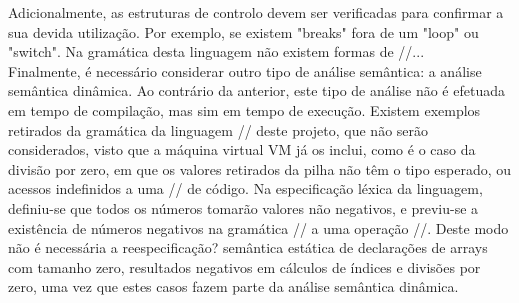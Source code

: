 Adicionalmente, as estruturas de controlo devem ser verificadas para confirmar a sua devida utilização.
Por exemplo, se existem "breaks" fora de um "loop" ou "switch". Na gramática desta linguagem não existem
formas de //...\\

Finalmente, é necessário considerar outro tipo de análise semântica: a análise semântica dinâmica.
Ao contrário da anterior, este tipo de análise não é efetuada em tempo de compilação, mas sim
em tempo de execução. Existem exemplos retirados da gramática da linguagem // deste projeto, que 
não serão considerados, visto que a máquina virtual VM já os inclui, como é o caso da divisão por
zero, em que os valores retirados da pilha não têm o tipo esperado, ou acessos indefinidos a uma
// de código. Na especificação léxica da linguagem, definiu-se que todos os números tomarão valores
não negativos, e previu-se a existência de números negativos na gramática // a uma operação //. 
Deste modo não é necessária a reespecificação? semântica estática de declarações de arrays com
tamanho zero, resultados negativos em cálculos de índices e divisões por zero, uma vez que estes 
casos fazem parte da análise semântica dinâmica.\\












